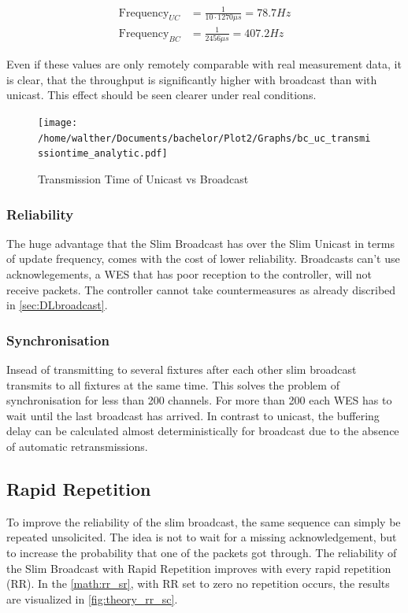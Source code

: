 \begin{align}
	\text{Frequency}_{UC} &= \frac{1}{10 \cdot 1270\mu s} = 78.7 Hz \\
	\text{Frequency}_{BC} &= \frac{1}{2456\mu s} = 407.2 Hz
\end{align}

Even if these values are only remotely comparable with real measurement data, it is clear,
that the throughput is significantly higher with broadcast than with unicast.
This effect should be seen clearer under real conditions.

\begin{figure}[h]
	\centering
	\texttt{[image: /home/walther/Documents/bachelor/Plot2/Graphs/bc\_uc\_transmissiontime\_analytic.pdf]}
	\caption{Transmission Time of Unicast vs Broadcast}
	\label{fig:bc_uc_transmissiontime_analytic}
\end{figure}

\subsubsection*{Reliability}

The huge advantage that the Slim Broadcast has over the Slim Unicast in terms of update frequency,
comes with the cost of lower reliability.
Broadcasts can't use acknowlegements,
a WES that has poor reception to the controller, will not receive packets.
The controller cannot take countermeasures
as already discribed in \cref{sec:DLbroadcast}.

\subsubsection*{Synchronisation}
Insead of transmitting to several fixtures after each other slim broadcast transmits to all fixtures at the same time.
This solves the problem of synchronisation for less than 200 channels.
For more than 200 each WES has to wait until the last broadcast has arrived.
In contrast to unicast, the buffering delay can be calculated almost deterministically for broadcast 
due to the absence of automatic retransmissions.

\subsection*{Rapid Repetition}

To improve the reliability of the slim broadcast, 
the same sequence can simply be repeated unsolicited.
The idea is not to wait for a missing acknowledgement, 
but to increase the probability that one of the packets got through.
The reliability of the Slim Broadcast with Rapid Repetition improves with every rapid repetition (RR).
In the \cref{math:rr_sr}, with RR set to zero no repetition occurs, 
the results are visualized in \cref{fig:theory_rr_sc}.

